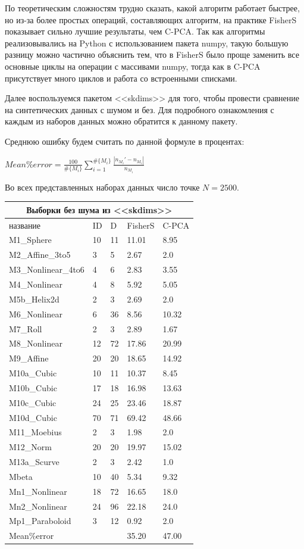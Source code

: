 \documentclass[english, russian]{sobraep}
\begin{document}
По теоретическим сложностям трудно сказать, какой алгоритм работает быстрее, но из-за более простых операций, составляющих алгоритм, на практике FisherS показывает сильно лучшие результаты, чем C-PCA. Так как алгоритмы реализовывались на Python с использованием пакета numpy, такую большую разницу можно частично объяснить тем, что в FisherS было проще заменить все основные циклы на операции с массивами numpy, тогда как в C-PCA присутствует много циклов и работа со встроенными списками.

Далее воспользуемся пакетом <<skdims>> для того, чтобы провести сравнение на синтетических данных с шумом и без. Для подробного ознакомления с каждым из наборов данных можно обратится к данному пакету.

Среднюю ошибку будем считать по данной формуле в процентах:

\begin{center}
    $Mean\%error = \frac{100}{\#\{M_i\}}\sum_{i=1}^{\#\{M_i\}}\frac{|n_M_i' - n_M_i|}{n_M_i}$
\end{center}
Во всех представленных наборах данных число точке $N = 2500$.


\begin{tabular}{
p{2.4cm}|p{0.9cm}|p{0.9cm}|p{0.9cm}|p{0.9cm}  }
 \hline
 \multicolumn{5}{c}{Выборки без шума из <<skdims>>} \\
 \hline
 название & ID & D & FisherS& C-PCA\\
 \hline
 M1_Sphere & 10 & 11 & 11.01 & 8.95\\
M2_Affine_3to5 & 3 & 5 & 2.67 & 2.0\\
M3_Nonlinear_4to6   & 4 & 6 & 2.83 & 3.55\\
M4_Nonlinear   & 4 & 8 & 5.92 & 5.05\\
M5b_Helix2d   & 2 & 3 & 2.69 & 2.0\\
M6_Nonlinear   & 6 & 36 & 8.56 & 10.32\\
M7_Roll   & 2 & 3 & 2.89 & 1.67\\
M8_Nonlinear   & 12 & 72 & 17.86 & 20.99\\
M9_Affine   & 20 & 20 & 18.65 & 14.92\\
M10a_Cubic   & 10 & 11 & 10.37 & 8.45\\
M10b_Cubic   & 17 & 18 & 16.98 & 13.63\\
M10c_Cubic   & 24 & 25 & 23.46 & 18.87\\
M10d_Cubic   & 70 & 71 & 69.42 & 48.66\\
M11_Moebius   & 2 & 3 & 1.98 & 2.0\\
M12_Norm   & 20 & 20 & 19.97 & 15.02\\
M13a_Scurve   & 2 & 3 & 2.42 & 1.0\\
Mbeta   & 10 & 40 & 5.34 & 9.32\\
Mn1_Nonlinear   & 18 & 72 & 16.65 & 18.0\\
Mn2_Nonlinear   & 24 & 96 & 22.18 & 24.0\\
Mp1_Paraboloid   & 3 & 12 & 0.92 & 2.0\\
\hline
Mean\%error & & & 35.20 & 47.00\\
 \hline

\end{tabular}
\end{document}
